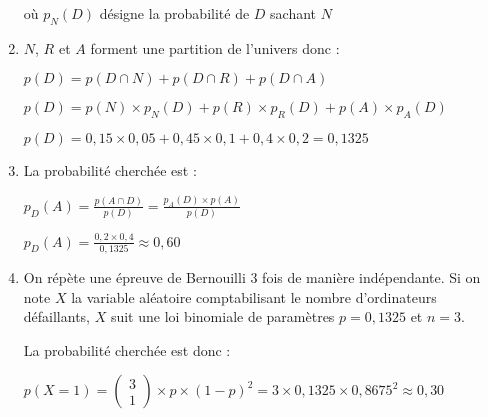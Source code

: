 \begin{corrige}
\begin{enumerate}
          \par
          où $p_{N}\left(D\right)$ désigne la probabilité de $D$ sachant $N$
          \item
          $N$, $R$ et $A$ forment une partition de l'univers donc :
          \par
          $p\left(D\right)=p\left(D \cap  N\right)+p\left(D \cap  R\right)+p\left(D \cap  A\right)$
          \par
          $p\left(D\right)=p\left(N\right)\times p_{N}\left(D\right)+p\left(R\right)\times p_{R}\left(D\right)+p\left(A\right)\times p_{A}\left(D\right)$
          \par
          $p\left(D\right)=0,15\times 0,05+0,45\times 0,1+ 0,4\times 0,2=0,1325$
          \item
          La probabilité cherchée est :
          \par
          $p_{D}\left(A\right)=\frac{p\left(A \cap  D\right)}{p\left(D\right)}=\frac{p_{A}\left(D\right)\times p\left(A\right)}{p\left(D\right)}$
          \par
          $p_{D}\left(A\right)=\frac{0,2\times 0,4}{0,1325}\approx 0,60$
          \item
          On répète une épreuve de Bernouilli 3 fois de manière indépendante. Si on note $X$ la variable aléatoire comptabilisant le nombre d'ordinateurs défaillants, $X$ suit une loi binomiale de paramètres $p=0,1325$ et $n=3$.
          \par
          La probabilité cherchée est donc :
          \par
          $p\left(X=1\right)=\begin{pmatrix} 3 \\ 1 \end{pmatrix}\times p\times \left(1-p\right)^{2}=3\times 0,1325\times 0,8675^{2}\approx 0,30$
     \end{enumerate}
\end{corrige}
